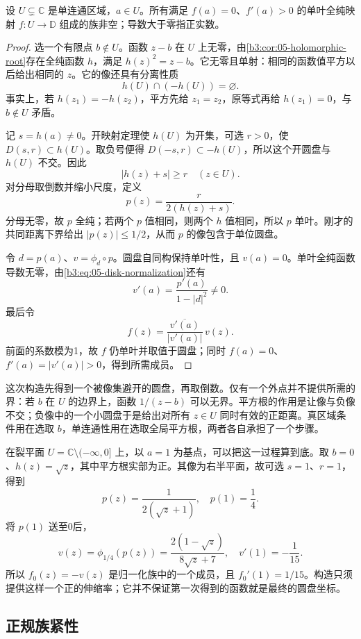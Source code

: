 \begin{lemma}\label{b3:lem:05-nonempty-normalized}
设 \(U\subsetneq\mathbb C\) 是单连通区域，\(a\in U\)。所有满足 \(f(a)=0\)、\(f'(a)>0\) 的单叶全纯映射 \(f:U\to\mathbb D\) 组成的族非空；导数大于零指正实数。
\end{lemma}
\begin{proof}
选一个有限点 \(b\notin U\)。函数 \(z-b\) 在 \(U\) 上无零，由\cref{b3:cor:05-holomorphic-root}存在全纯函数 \(h\)，满足 \(h(z)^2=z-b\)。它无零且单射：相同的函数值平方以后给出相同的 \(z\)。它的像还具有分离性质
\[
 h(U)\cap(-h(U))=\varnothing.
\]
事实上，若 \(h(z_1)=-h(z_2)\)，平方先给 \(z_1=z_2\)，原等式再给 \(h(z_1)=0\)，与 \(b\notin U\) 矛盾。

记 \(s=h(a)\ne0\)。开映射定理使 \(h(U)\) 为开集，可选 \(r>0\)，使 \(D(s,r)\subset h(U)\)。取负号便得 \(D(-s,r)\subset-h(U)\)，所以这个开圆盘与 \(h(U)\) 不交。因此
\[
 |h(z)+s|\ge r\quad(z\in U).
\]
对分母取倒数并缩小尺度，定义
\[
 p(z)=\frac{r}{2(h(z)+s)}.
\]
分母无零，故 \(p\) 全纯；若两个 \(p\) 值相同，则两个 \(h\) 值相同，所以 \(p\) 单叶。刚才的共同距离下界给出 \(|p(z)|\le1/2\)，从而 \(p\) 的像包含于单位圆盘。

令 \(d=p(a)\)、\(v=\phi_d\circ p\)。圆盘自同构保持单叶性，且 \(v(a)=0\)。单叶全纯函数导数无零，由\eqref{b3:eq:05-disk-normalization}还有
\[
 v'(a)=\frac{p'(a)}{1-|d|^2}\ne0.
\]
最后令
\[
 f(z)=\frac{\overline{v'(a)}}{|v'(a)|}\,v(z).
\]
前面的系数模为1，故 \(f\) 仍单叶并取值于圆盘；同时 \(f(a)=0\)、\(f'(a)=|v'(a)|>0\)，得到所需成员。
\end{proof}

这次构造先得到一个被像集避开的圆盘，再取倒数。仅有一个外点并不提供所需的界：若 \(b\) 在 \(U\) 的边界上，函数 \(1/(z-b)\) 可以无界。平方根的作用是让像与负像不交；负像中的一个小圆盘于是给出对所有 \(z\in U\) 同时有效的正距离。真区域条件用在选取 \(b\)，单连通性用在选取全局平方根，两者各自承担了一个步骤。

\ProseParagraphBreak

在裂平面 \(U=\mathbb C\setminus(-\infty,0]\) 上，以 \(a=1\) 为基点，可以把这一过程算到底。取 \(b=0\)、\(h(z)=\sqrt z\)，其中平方根实部为正。其像为右半平面，故可选 \(s=1\)、\(r=1\)，得到
\[
 p(z)=\frac1{2(\sqrt z+1)},\quad p(1)=\frac14.
\]
将 \(p(1)\) 送至0后，
\[
 v(z)=\phi_{1/4}(p(z))
 =\frac{2(1-\sqrt z)}{8\sqrt z+7},
 \quad v'(1)=-\frac1{15}.
\]
所以 \(f_0(z)=-v(z)\) 是归一化族中的一个成员，且 \(f_0'(1)=1/15\)。构造只须提供这样一个正的伸缩率；它并不保证第一次得到的函数就是最终的圆盘坐标。

\subsection{正规族紧性}
\label{b3:subsec:050202}

